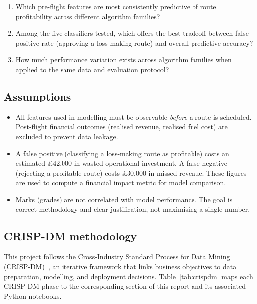 \documentclass[12pt,a4paper]{article}
\begin{document}
\begin{enumerate}[leftmargin=*]
  \item Which pre-flight features are most consistently predictive of route profitability across different algorithm families?
  \item Among the five classifiers tested, which offers the best tradeoff between false positive rate (approving a loss-making route) and overall predictive accuracy?
  \item How much performance variation exists across algorithm families when applied to the same data and evaluation protocol?
\end{enumerate}

\subsection{Assumptions}
\label{subsec:assumptions}

\begin{itemize}[leftmargin=*]
  \item All features used in modelling must be observable \emph{before} a route is scheduled. Post-flight financial outcomes (realised revenue, realised fuel cost) are excluded to prevent data leakage.
  \item A false positive (classifying a loss-making route as profitable) costs an estimated £42,000 in wasted operational investment. A false negative (rejecting a profitable route) costs £30,000 in missed revenue. These figures are used to compute a financial impact metric for model comparison.
  \item Marks (grades) are not correlated with model performance. The goal is correct methodology and clear justification, not maximising a single number.
\end{itemize}

\subsection{CRISP-DM methodology}
\label{subsec:crispdm}

This project follows the Cross-Industry Standard Process for Data Mining (CRISP-DM)~\cite{wirth2000crisp}, an iterative framework that links business objectives to data preparation, modelling, and deployment decisions. Table~\ref{tab:crispdm} maps each CRISP-DM phase to the corresponding section of this report and its associated Python notebooks.
\end{document}
